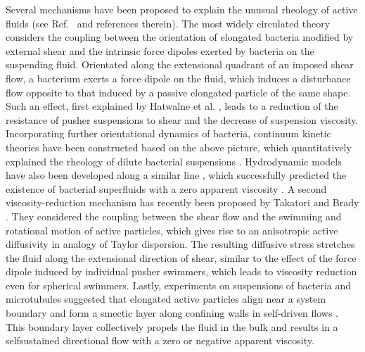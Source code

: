 Several mechanisms have been proposed to explain the unusual rheology of active fluids (see Ref.~\cite{Saintillan2018} and references therein). The most widely circulated theory considers
the coupling between the orientation of elongated bacteria modified by external shear and the intrinsic force dipoles exerted by bacteria on the suspending fluid. Orientated along the extensional quadrant of an imposed shear flow, a bacterium exerts a force dipole on the fluid, which induces a disturbance flow opposite to that induced by a passive elongated particle of the same shape.
Such an effect, first explained by Hatwalne et al. \cite{Hatwalne2004}, leads to a reduction of the resistance of pusher suspensions to shear and the decrease of suspension viscosity. Incorporating further orientational dynamics of bacteria, continuum kinetic theories have been constructed based on the above picture, which quantitatively explained the rheology of dilute bacterial suspensions
\cite{Haines2009, Saintillan2010, Ryan2011, Moradi2015, Alonso-Matilla2016, Bechtel2017}.
Hydrodynamic models have also been developed along a similar line \cite{Cates2008, Giomi2010, Somka2017}, which successfully predicted the existence of bacterial superfluids with a zero apparent viscosity \cite{Marchetti2015}.
A second viscosity-reduction mechanism has recently been proposed by Takatori and Brady \cite{Takatori2014a, Takatori2014b, Takatori2017}. They considered the coupling between the shear flow and the swimming and rotational motion of active particles, which gives rise to an anisotropic active diffusivity in analogy of Taylor dispersion. The resulting diffusive stress stretches the fluid along the extensional direction of shear, similar to the effect of the force dipole induced by individual pusher swimmers, which leads to viscosity reduction even for spherical swimmers.
Lastly, experiments on suspensions of bacteria and microtubules suggested that elongated active particles align near a system boundary and form a smectic layer along confining walls in self-driven flows \cite{Wioland2016, Wu2017, Lushi2014}.
This boundary layer collectively propels the fluid in the bulk and results in a selfsustained directional flow with a zero or negative apparent
viscosity.

